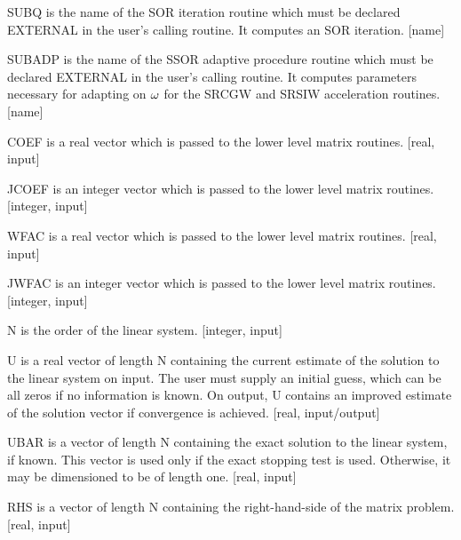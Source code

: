 \begin{list}{}{
               \leftmargin 1.00in \rightmargin 0.25in}
 \item[SUBQ \hfill]
           is the name of the SOR iteration routine which must be
           declared EXTERNAL in the user's calling routine.
           It computes an SOR iteration.  [name]
 
 \item[SUBADP \hfill]
           is the name of the SSOR adaptive procedure routine which 
           must be declared EXTERNAL in the user's calling routine.
           It computes parameters necessary for adapting on
           $\omega$ for the SRCGW and SRSIW acceleration routines.
           [name]
 
 \item[COEF \hfill]
           is a real vector which is passed to the lower level
           matrix routines.  [real, input]
 
 \item[JCOEF \hfill]
           is an integer vector which is passed to the lower level
           matrix routines.  [integer, input]
 
 \item[WFAC \hfill]
           is a real vector which is passed to the lower level
           matrix routines.  [real, input]
 
 \item[JWFAC \hfill]
           is an integer vector which is passed to the lower level
           matrix routines.  [integer, input]
 
 \item[N \hfill]
           is the order of the linear system.  [integer, input]
 
 \item[U \hfill]
           is a real vector of length N containing the current
           estimate of the solution to the linear system on
           input.  The user must supply an initial guess, which
           can be all zeros if no information is known.  On
           output, U contains an improved estimate of the solution
           vector if convergence is achieved.  [real, input/output]
 
 \item[UBAR \hfill]
           is a vector of length N containing the exact solution 
           to the linear system, if known.  This vector is used 
           only if the exact stopping test is used.  Otherwise, 
           it may be dimensioned to be of length one.  [real, input]
 
 \item[RHS \hfill]
           is a vector of length N containing the right-hand-side
           of the matrix problem.  [real, input]
 

\end{list}
